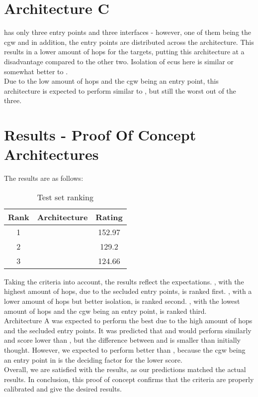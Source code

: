 \section{Architecture C}
\label{sec:archc}

 has only three entry points and three interfaces - however, one of them being the \acrshort{cgw} and 
in addition, the entry points are distributed across the architecture. 
This results in a lower amount of hops for the targets, putting this architecture at a disadvantage compared to the other two.
Isolation of \acrshort{ecu}s here is similar or somewhat better to .\\
Due to the low amount of hops and the \acrshort{cgw} being an entry point, this architecture is expected to perform 
similar to , but still the worst out of the three.


\section{Results - Proof Of Concept Architectures}
\label{sec:resultsproof}

The results are as follows:

\begin{table}[h]
    \label{table:pocranking}
    \centering
    \caption{Test set ranking}
    \begin{tabular}{ |c|c|c| } 
    \hline
    Rank & Architecture & Rating\\
    \hline
    1 & \nameref{fig:architectureA} & 152.97\\ 
    2 & \nameref{fig:architectureB} & 129.2\\
    3 & \nameref{fig:architectureC} & 124.66\\
    \hline
    \end{tabular}
\end{table}

Taking the criteria into account, the results reflect the expectations.
, with the highest amount of hops, due to the secluded entry points, is ranked first.
, with a lower amount of hops but better isolation, is ranked second.
, with the lowest amount of hops and the \acrshort{cgw} being an entry point, is ranked third.\\

Architecture A was expected to perform the best due to the high amount of hops and the secluded entry points.
It was predicted that  and  would perform similarly and score lower than ,
but the difference between  and  is smaller than initially thought. 
However, we expected  to perform better than , 
because the \acrshort{cgw} being an entry point in  is the deciding factor for the lower score.\\

Overall, we are satisfied with the results, as our predictions matched the actual results.
In conclusion, this proof of concept confirms that the criteria are properly calibrated and give the desired results.